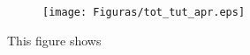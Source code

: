 \documentclass[oneside,11pt]{article}
\begin{document}
\begin{figure}[H]
\end{figure}

\cleardoublepage



\begin{figure}[H]
     \caption{ToT \& TuT as LATE}
    \label{tot_tut_graph}
    \begin{center}
    \begin{subfigure}{0.9\textwidth}
        \centering
        \texttt{[image: Figuras/tot\_tut\_apr.eps]}
    \end{subfigure}
    \end{center}
    \scriptsize
    This figure shows 
\end{figure}
\end{document}
